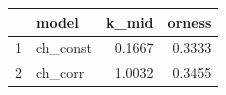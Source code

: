 \begin{table}[ht]
\centering
\begin{tabular}{rlrr}
  \hline
 & model & k\_mid & orness \\
  \hline
1 & ch\_const & 0.1667 & 0.3333 \\
  2 & ch\_corr & 1.0032 & 0.3455 \\
   \hline
\end{tabular}
\end{table}
